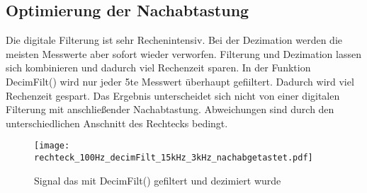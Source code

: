 \documentclass{article}%
\begin{document}
\subsection{Optimierung der Nachabtastung}

	Die digitale Filterung ist sehr Rechenintensiv. Bei der Dezimation werden die meisten Messwerte aber sofort wieder 
	verworfen. Filterung und Dezimation lassen sich kombinieren und dadurch viel Rechenzeit sparen. 
	In der Funktion DecimFilt() wird nur jeder 5te Messwert überhaupt gefiiltert. Dadurch wird viel Rechenzeit gespart. 
	Das Ergebnis unterscheidet sich nicht von einer digitalen Filterung mit 
	anschließender Nachabtastung. Abweichungen sind durch den unterschiedlichen Anschnitt des Rechtecks bedingt.

	\begin{figure}[htb]
		\centering
		\texttt{[image: rechteck\_100Hz\_decimFilt\_15kHz\_3kHz\_nachabgetastet.pdf]}
		\caption{Signal das mit DecimFilt() gefiltert und dezimiert wurde}
	\end{figure}	
\end{document}
